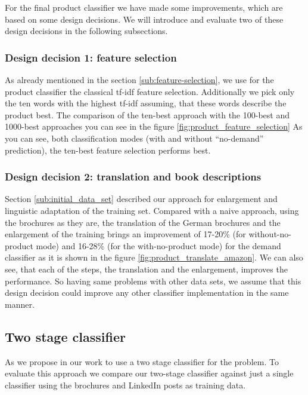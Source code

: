 For the final product classifier we have made some improvements, which are based on some design decisions.
We will introduce and evaluate two of these design decisions in the following subsections.

\subsubsection{Design decision 1: feature selection}
As already mentioned in the section \ref{sub:feature-selection}, we use for the product classifier the classical tf-idf feature selection.
Additionally we pick only the ten words with the highest tf-idf assuming, that these words describe the product best.
The comparison of the ten-best approach with the 100-best and 1000-best approaches you can see in the figure \ref{fig:product_feature_selection}
As you can see, both classification modes (with and without ``no-demand'' prediction), the ten-best feature selection performs best.

\subsubsection{Design decision 2: translation and book descriptions}
Section \ref{sub:initial_data_set} described our approach for enlargement and linguistic adaptation of the training set.
Compared with a naive approach, using the brochures as they are, the translation of the German brochures and the enlargement of the training brings an improvement of 17-20\% (for without-no-product mode) and 16-28\% (for the with-no-product mode) for the demand classifier as it is shown in the figure \ref{fig:product_translate_amazon}.
We can also see, that each of the steps, the translation and the enlargement, improves the performance.
So having same problems with other data sets, we assume that this design decision could improve any other classifier implementation in the same manner.

\subsection{Two stage classifier}
\label{sub:two_stage_classifier}

As we propose in our work to use a two stage classifier for the \nto problem.
To evaluate this approach we compare our two-stage classifier against just a single classifier using the brochures and LinkedIn posts as training data.

